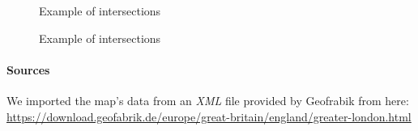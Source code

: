 \begin{figure}[H]
	
	\caption{Example of intersections}
\end{figure}

\begin{figure}[H]
	
	\caption{Example of intersections}
\end{figure}

\paragraph{Sources}
We imported the map's data from an \textit{XML} file provided by Geofrabik from 
here: 
\url{https://download.geofabrik.de/europe/great-britain/england/greater-london.html}


